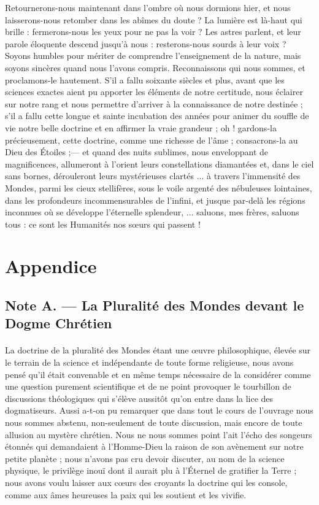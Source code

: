 \documentclass[a4paper, 11pt, oneside]{article}
\begin{document}
Retournerons-nous maintenant dans l'ombre où nous dormions hier, et nous laisserons-nous retomber dans les abîmes du doute ? La lumière est là-haut qui brille : fermerons-nous les yeux pour ne pas la voir ? Les astres parlent, et leur parole éloquente descend jusqu'à nous : resterons-nous sourds à leur voix ? Soyons humbles pour mériter de comprendre l'enseignement de la nature, mais soyons sincères quand nous l'avons compris. Reconnaissons qui nous sommes, et proclamons-le hautement. S'il a fallu soixante siècles et plus, avant que les sciences exactes aient pu apporter les éléments de notre certitude, nous éclairer sur notre rang et nous permettre d'arriver à la connaissance de notre destinée ; s'il a fallu cette longue et sainte incubation des années pour animer du souffle de vie notre belle doctrine et en affirmer la vraie grandeur ; oh ! gardons-la précieusement, cette doctrine, comme une richesse de l'âme ; consacrons-la au Dieu des Étoiles ;--- et quand des nuits sublimes, nous enveloppant de magnificences, allumeront à l'orient leurs constellations diamantées et, dans le ciel sans bornes, dérouleront leurs mystérieuses clartés ... à travers l'immensité des Mondes, parmi les cieux stellifères, sous le voile argenté des nébuleuses lointaines, dans les profondeurs incommensurables de l'infini, et jusque par-delà les régions inconnues où se développe l'éternelle splendeur, ... saluons, mes frères, saluons tous : ce sont les Humanités nos sœurs qui passent !
\clearpage
\section{Appendice}
\subsection{Note A. --- La Pluralité des Mondes devant le Dogme Chrétien}
\paragraph{}
La doctrine de la pluralité des Mondes étant une œuvre philosophique, élevée sur le terrain de la science et indépendante de toute forme religieuse, nous avons pensé qu'il était convenable et en même temps nécessaire de la considérer comme une question purement scientifique et de ne point provoquer le tourbillon de discussions théologiques qui s'élève aussitôt qu'on entre dans la lice des dogmatiseurs. Aussi a-t-on pu remarquer que dans tout le cours de l'ouvrage nous nous sommes abstenu, non-seulement de toute discussion, mais encore de toute allusion au mystère chrétien. Nous ne nous sommes point l'ait l'écho des songeurs étonnés qui demandaient à l'Homme-Dieu la raison de son avènement sur notre petite planète ; nous n'avons pas cru devoir discuter, au nom de la science physique, le privilège inouï dont il aurait plu à l'Éternel de gratifier la Terre ; nous avons voulu laisser aux cœurs des croyants la doctrine qui les console, comme aux âmes heureuses la paix qui les soutient et les vivifie.
\end{document}
